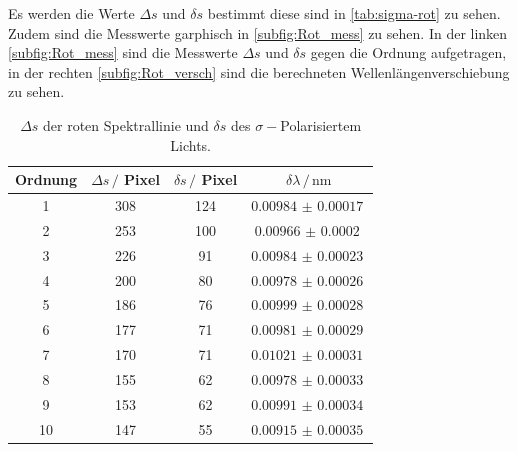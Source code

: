 Es werden die Werte $\Delta s$ und $\delta s$ bestimmt diese sind in \autoref{tab:sigma-rot} zu sehen.
Zudem sind die Messwerte garphisch in \autoref{subfig:Rot_mess} zu sehen.
In der linken \autoref{subfig:Rot_mess} sind die Messwerte $\Delta s$ und $\delta s$ gegen die Ordnung aufgetragen,
in der rechten \autoref{subfig:Rot_versch} sind die berechneten Wellenlängenverschiebung zu sehen.
\begin{table}
    \centering
    \caption{$\Delta s$ der roten Spektrallinie und $\delta s$ des $\sigma -$Polarisiertem Lichts.}
    \begin{tabular}{cccc}
        \toprule
        Ordnung & $\Delta s \, /$ Pixel & $\delta s \, /$ Pixel & $\delta \lambda \, / \, \si{\nano\meter}$ \\
        \midrule
        1  & 308 & 124 & $\SI{0.00984(17)}{}$ \\
        2  & 253 & 100 & $\SI{0.00966(20)}{}$  \\
        3  & 226 & 91  & $\SI{0.00984(23)}{}$   \\
        4  & 200 & 80  & $\SI{0.00978(26)}{}$  \\
        5  & 186 & 76  & $\SI{0.00999(28)}{}$ \\
        6  & 177 & 71  & $\SI{0.00981(29)}{}$  \\
        7  & 170 & 71  & $\SI{0.01021(31)}{}$  \\
        8  & 155 & 62  & $\SI{0.00978(33)}{}$  \\
        9  & 153 & 62  & $\SI{0.00991(34)}{}$   \\
        10 & 147 & 55  & $\SI{0.00915(35)}{}$   \\
        \bottomrule
    \end{tabular}
    \label{tab:sigma-rot}
\end{table}

